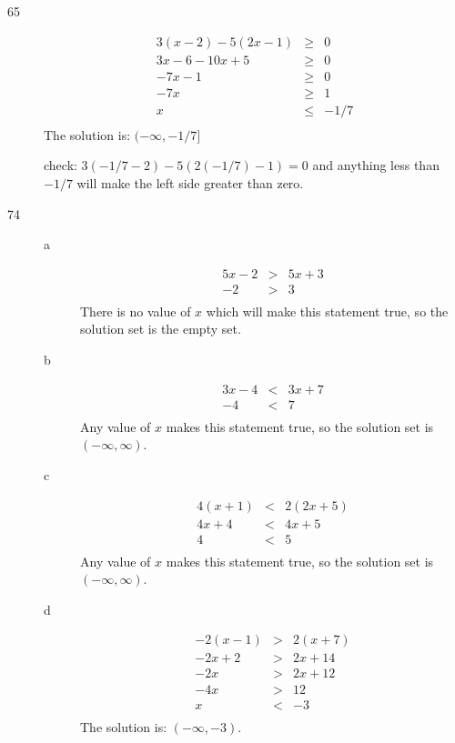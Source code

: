 \documentclass[letterpaper]{exam}
\begin{document}
\begin{description}
      \item[65]
      \begin{align*}
        3(x - 2) - 5(2x - 1) &\geq& 0 \\
        3x - 6 - 10x + 5 &\geq& 0 \\
        -7x - 1 &\geq& 0 \\
        -7x  &\geq& 1 \\
        x  &\leq& -1/7 \\
      \end{align*}
      The solution is: \( (-\infty, -1/7] \)

      check: \( 3(-1/7 - 2) - 5(2(-1/7) - 1) = 0 \) and anything less than $-1/7$ will make the left side greater than zero.

      \item[74]
        \begin{description}
        \item[a]
        \begin{align*}
          5x - 2 &>& 5x + 3 \\
          -2 &>& 3 \\
        \end{align*}
      There is no value of $x$ which will make this statement true, so the solution set is the empty set.

        \item[b]
        \begin{align*}
          3x - 4 &<& 3x + 7 \\
          -4 &<& 7 \\
        \end{align*}
      Any value of $x$ makes this statement true, so the solution set is $(-\infty, \infty)$.

        \item[c]
        \begin{align*}
          4(x + 1) &<& 2(2x + 5) \\
          4x + 4 &<& 4x + 5 \\
          4 &<& 5 \\
        \end{align*}
      Any value of $x$ makes this statement true, so the solution set is $(-\infty, \infty)$.

        \item[d]
        \begin{align*}
          -2(x - 1) &>& 2(x + 7) \\
          -2x + 2 &>& 2x + 14\\
          -2x &>& 2x + 12\\
          -4x &>& 12\\
          x &<& -3\\
        \end{align*}
      The solution is: $(-\infty, -3)$.


\end{description}
\end{description}
\end{document}
